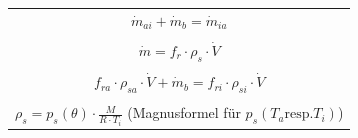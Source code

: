 \begin{center}
    \begin{tabular}{c} 
    \\
    $ \dot{m}_{ai} + \dot{m}_b = \dot{m}_{ia} $ \\
    \\
    $ \dot{m} = f_r \cdot \rho_s \cdot \dot{V} $ \\
    \\
    $ f_{ra} \cdot \rho_{sa} \cdot \dot{V} + \dot{m}_b = f_{ri} \cdot \rho_{si} \cdot \dot{V} $ \\
    \\
    $ \rho_s = p_s (\theta) \cdot \frac{M}{R \cdot T_i} $ (Magnusformel für $p_s(T_a \text{resp.} T_i)$) \\
    \end{tabular}
\end{center}


